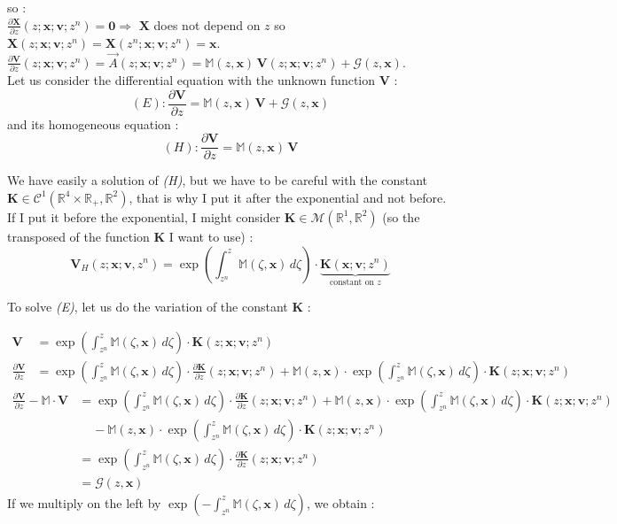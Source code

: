 \documentclass[10pt]{article}
\newcommand{\D}{{\partial}}
\begin{document}
so : \\ $\frac{\D \mathbf{X}}{\D z}(z;\mathbf{x;v};z^n) = \mathbf{0} \Rightarrow$ $\mathbf{X}$ does not depend on $z$ so $\mathbf{X}(z;\mathbf{x;v};z^n) = \mathbf{X}(z^n;\mathbf{x;v};z^n) = \mathbf{x}$. \\
$\frac{\D \mathbf{V}}{\D z}(z;\mathbf{x;v};z^n) = \stackrel{\rightarrow}{A}(z;\mathbf{x;v};z^n) = \mathbb{M}(z,\mathbf{x})\,\mathbf{V}(z;\mathbf{x;v};z^n)+\mathcal{G}(z,\mathbf{x})$. \\

Let us consider the differential equation with the unknown function $\mathbf{V}$ :
$$(E) : \frac{\D \mathbf{V}}{\D z} = \mathbb{M}(z,\mathbf{x})\,\mathbf{V}+\mathcal{G}(z,\mathbf{x})$$
and its homogeneous equation :
$$(H) : \frac{\D \mathbf{V}}{\D z} = \mathbb{M}(z,\mathbf{x})\,\mathbf{V}$$

We have easily a solution of \textit{(H)}, but we have to be careful with the constant $\mathbf{K}\in\mathcal{C}^1(\mathbb{R}^4\times\mathbb{R}_{+},\mathbb{R}^2)$, that is why I put it after the exponential and not before. If I put it before the exponential, I might consider $\mathbf{K}\in\mathcal{M}(\mathbb{R}^1,\mathbb{R}^2)$ (so the transposed of the function $\mathbf{K}$ I want to use) :
$$\mathbf{V}_H(z;\mathbf{x;v},z^n) = \exp\left(\int_{z^n}^z \mathbb{M}(\zeta,\mathbf{x})\,d\zeta\right)\cdot\underbrace{\mathbf{K}(\mathbf{x;v};z^n)}_{\mbox{constant on } z}$$

To solve \textit{(E)}, let us do the variation of the constant $\mathbf{K}$ :

\begin{align*}
\mathbf{V} &= \exp\left(\int_{z^n}^z \mathbb{M}(\zeta,\mathbf{x})\,d\zeta\right)\cdot\mathbf{K}(z;\mathbf{x;v};z^n) \\
\frac{\D \mathbf{V}}{\D z} &= \exp\left(\int_{z^n}^z \mathbb{M}(\zeta,\mathbf{x})\,d\zeta\right)\cdot\frac{\D \mathbf{K}}{\D z}(z;\mathbf{x;v};z^n) + \mathbb{M}(z,\mathbf{x})\cdot\exp\left(\int_{z^n}^z \mathbb{M}(\zeta,\mathbf{x})\,d\zeta\right)\cdot\mathbf{K}(z;\mathbf{x;v};z^n)
\end{align*}
\begin{align*}
\frac{\D \mathbf{V}}{\D z} - \mathbb{M}\cdot\mathbf{V} &= \exp\left(\int_{z^n}^z \mathbb{M}(\zeta,\mathbf{x})\,d\zeta\right)\cdot\frac{\D \mathbf{K}}{\D z}(z;\mathbf{x;v};z^n) + \mathbb{M}(z,\mathbf{x})\cdot\exp\left(\int_{z^n}^z \mathbb{M}(\zeta,\mathbf{x})\,d\zeta\right)\cdot\mathbf{K}(z;\mathbf{x;v};z^n) \\
&\;\;\;\; - \mathbb{M}(z,\mathbf{x})\cdot\exp\left(\int_{z^n}^z \mathbb{M}(\zeta,\mathbf{x})\,d\zeta\right)\cdot\mathbf{K}(z;\mathbf{x;v};z^n) \\
&=\exp\left(\int_{z^n}^z \mathbb{M}(\zeta,\mathbf{x})\,d\zeta\right)\cdot \frac{\D \mathbf{K}}{\D z}(z;\mathbf{x;v};z^n) \\
&= \mathcal{G}(z,\mathbf{x})
\end{align*}
If we multiply on the left by $\exp\left(- \int_{z^n}^z \mathbb{M}(\zeta,\mathbf{x})\,d\zeta\right)$, we obtain :
\end{document}
